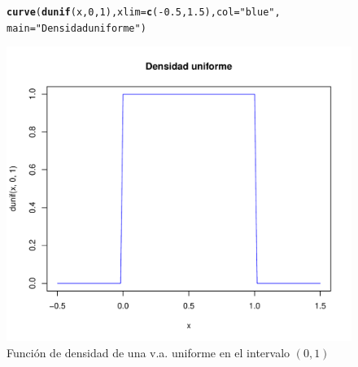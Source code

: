 \documentclass[handout]{beamer}\usepackage[]{graphicx}\usepackage[]{color}
\makeatletter
\def\maxwidth{ %
  \ifdim\Gin@nat@width>\linewidth
    \linewidth
  \else
    \Gin@nat@width
  \fi
}
\newcommand{\hlnum}[1]{\textcolor[rgb]{0.686,0.059,0.569}{#1}}%
\newcommand{\hlstr}[1]{\textcolor[rgb]{0.192,0.494,0.8}{#1}}%
\newcommand{\hlopt}[1]{\textcolor[rgb]{0,0,0}{#1}}%
\newcommand{\hlstd}[1]{\textcolor[rgb]{0.345,0.345,0.345}{#1}}%
\newcommand{\hlkwc}[1]{\textcolor[rgb]{0.333,0.667,0.333}{#1}}%
\newcommand{\hlkwd}[1]{\textcolor[rgb]{0.737,0.353,0.396}{\textbf{#1}}}%
\newenvironment{kframe}{%
 \def\at@end@of@kframe{}%
 \ifinner\ifhmode%
  \def\at@end@of@kframe{\end{minipage}}%
  \begin{minipage}{\columnwidth}%
 \fi\fi%
 \def\FrameCommand##1{\hskip\@totalleftmargin \hskip-\fboxsep
 \colorbox{shadecolor}{##1}\hskip-\fboxsep
     \hskip-\linewidth \hskip-\@totalleftmargin \hskip\columnwidth}%
 \MakeFramed {\advance\hsize-\width
   \@totalleftmargin\z@ \linewidth\hsize
   \@setminipage}}%
 {\par\unskip\endMakeFramed%
 \at@end@of@kframe}
\newenvironment{knitrout}{}{} %
\theoremstyle{plain}
\theoremstyle{definition}
\makeatother
\begin{document}
\begin{frame}[fragile]

\begin{figure}
\begin{center}
\begin{knitrout}
\color{fgcolor}\begin{kframe}
\begin{alltt}
\hlkwd{curve}\hlstd{(}\hlkwd{dunif}\hlstd{(x,}\hlnum{0}\hlstd{,}\hlnum{1}\hlstd{),}\hlkwc{xlim}\hlstd{=}\hlkwd{c}\hlstd{(}\hlopt{-}\hlnum{0.5}\hlstd{,}\hlnum{1.5}\hlstd{),}\hlkwc{col}\hlstd{=}\hlstr{"blue"}\hlstd{,}
      \hlkwc{main}\hlstd{=}\hlstr{"Densidad uniforme"}\hlstd{)}
\end{alltt}
\end{kframe}
\includegraphics[width=\maxwidth]{figure/unnamed-chunk-2-1} 

\end{knitrout}
\end{center}
\caption{Función de densidad de una v.a. uniforme en el intervalo
$(0,1)$}
\end{figure}

\end{frame}
\end{document}
